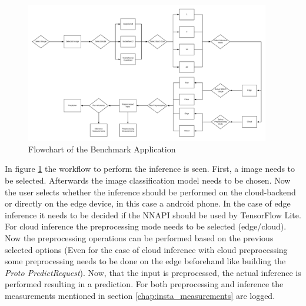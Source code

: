 \begin{figure}[htb]
\centering
\includegraphics[width=0.95\textwidth]{./Bilder/FlowChart_App.png}
\caption{Flowchart of the Benchmark Application}
\label{fig:app}
\end{figure}
In figure \ref{fig:app} the workflow to perform the inference is seen. First, a image needs to be selected. Afterwards the image classification model needs to be chosen. Now the user selects whether the inference should be performed on the cloud-backend or directly on the edge device, in this case a android phone. In the case of edge inference it needs to be decided if the NNAPI should be used by TensorFlow Lite. For cloud inference the preprocessing mode needs to be selected (edge/cloud). Now the preprocessing operations can be performed based on the previous selected options (Even for the case of cloud inference with cloud preprocessing some preprocessing needs to be done on the edge beforehand like building the \emph{Proto PredictRequest}). Now, that the input is preprocessed, the actual inference is performed resulting in a prediction. For both preprocessing and inference the measurements mentioned in section \ref{chap:insta_measurements} are logged.

